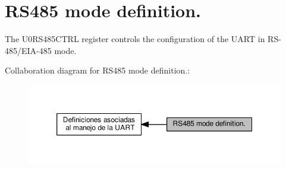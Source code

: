 \hypertarget{group___r_s485_m_o_d_e}{}\section{R\+S485 mode definition.}
\label{group___r_s485_m_o_d_e}


The U0\+R\+S485\+C\+T\+RL register controls the configuration of the U\+A\+RT in R\+S-\/485/\+E\+I\+A-\/485 mode.  


Collaboration diagram for R\+S485 mode definition.\+:\nopagebreak
\begin{figure}[H]
\begin{center}
\leavevmode
\includegraphics[width=350pt]{group___r_s485_m_o_d_e}
\end{center}
\end{figure}
